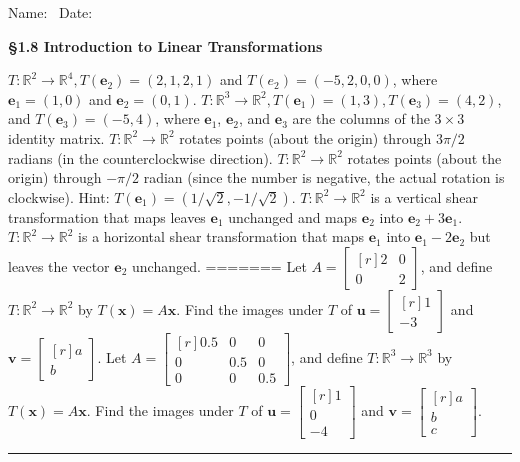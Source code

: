 \documentclass[11pt,answers]{exam} %
\renewcommand{\vec}[1]{\mathbf{#1}}
\newcommand{\mat}[1]{\begin{bmatrix*}[r] #1 \end{bmatrix*}}
\begin{document}
\flushleft
Name:\ \makebox[4in]{\hrulefill} \hspace{1in} Date:\ \makebox[1in]{\hrulefill}
\begin{center}
    \textbf{\S 1.8 Introduction to Linear Transformations}
\end{center}


\begin{questions}
    \question $T:\mathbb{R}^2\rightarrow \mathbb{R}^4, T(\vec{e}_2)=(2,1,2,1)$ and $T(e_2) = (-5,2,0,0)$, where $\vec{e}_1=(1,0)$ and $\vec{e}_2=(0,1)$.
    \question $T:\mathbb{R}^3\rightarrow \mathbb{R}^2, T(\vec{e}_1)=(1,3), T(\vec{e}_3)=(4,2)$, and $T(\vec{e}_3)=(-5,4)$, where $\vec{e}_1$, $\vec{e}_2$, and $\vec{e}_3$ are the columns of the $3 \times 3$ identity matrix.
    \question $T:\mathbb{R}^2\rightarrow \mathbb{R}^2$ rotates points (about the origin) through $3\pi/2$ radians (in the counterclockwise direction).
    \question $T:\mathbb{R}^2\rightarrow \mathbb{R}^2$ rotates points (about the origin) through $-\pi/2$ radian (since the number is negative, the actual rotation is clockwise). Hint: $T(\vec{e}_1) = (1/\sqrt{2}, -1/\sqrt{2})$.
    \question $T:\mathbb{R}^2\rightarrow \mathbb{R}^2$ is a vertical shear transformation that maps leaves $\vec{e}_1$ unchanged and maps $\vec{e}_2$ into $\vec{e}_2 + 3 \vec{e}_1$.
    \question $T:\mathbb{R}^2\rightarrow \mathbb{R}^2$ is a horizontal shear transformation that maps $\vec{e}_1$ into $\vec{e}_1-2\vec{e}_2$ but leaves the vector $\vec{e}_2$ unchanged.
    \question ======= Let $A = \mat{2 & 0 \\ 0 & 2}$, and define $T : \mathbb{R}^2 \rightarrow \mathbb{R}^2$ by $T\left(\vec{x}\right) = A\vec{x}$. Find the images under $T$ of $\vec{u}=\mat{1 \\ -3}$ and $\vec{v}=\mat{a \\ b }$.
    \question Let $A = \mat{0.5 & 0 & 0 \\ 0 & 0.5 & 0 \\ 0 & 0 & 0.5}$, and define $T : \mathbb{R}^3 \rightarrow \mathbb{R}^3$ by $T\left(\vec{x}\right) = A\vec{x}$. Find the images under $T$ of $\vec{u}=\mat{1 \\ 0 \\ -4}$ and $\vec{v}=\mat{a \\ b \\ c}$.
    \begin{center}\rule{4in}{0.1mm}\end{center}

\end{questions}
\end{document}
